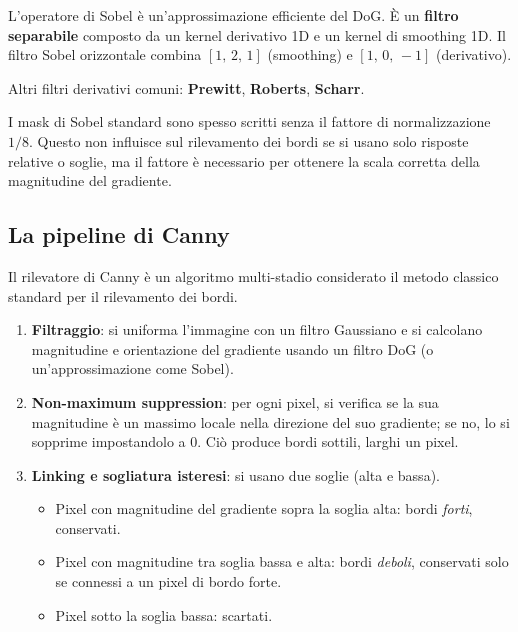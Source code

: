 \documentclass[12pt, a4paper]{report}
\begin{document}
L'operatore di Sobel è un'approssimazione efficiente del DoG.  È un
\textbf{filtro separabile} composto da un kernel derivativo 1D e un kernel di
smoothing 1D.  Il filtro Sobel orizzontale combina $[1,\,2,\,1]$ (smoothing) e
$[1,\,0,\,-1]$ (derivativo).

Altri filtri derivativi comuni: \textbf{Prewitt}, \textbf{Roberts}, \textbf{Scharr}.

\begin{notebox}
I mask di Sobel standard sono spesso scritti senza il fattore di normalizzazione
$1/8$.  Questo non influisce sul rilevamento dei bordi se si usano solo risposte
relative o soglie, ma il fattore è necessario per ottenere la scala corretta della
magnitudine del gradiente.
\end{notebox}

\subsection{La pipeline di Canny}

Il rilevatore di Canny è un algoritmo multi-stadio considerato il metodo classico
standard per il rilevamento dei bordi.

\begin{enumerate}
  \item \textbf{Filtraggio}: si uniforma l'immagine con un filtro Gaussiano e si
        calcolano magnitudine e orientazione del gradiente usando un filtro DoG (o
        un'approssimazione come Sobel).

  \item \textbf{Non-maximum suppression}: per ogni pixel, si verifica se la sua
        magnitudine è un massimo locale nella direzione del suo gradiente; se no, lo
        si sopprime impostandolo a 0.  Ciò produce bordi sottili, larghi un pixel.

  \item \textbf{Linking e sogliatura isteresi}: si usano due soglie (alta e bassa).
        \begin{itemize}
          \item Pixel con magnitudine del gradiente sopra la soglia alta:
                bordi \emph{forti}, conservati.
          \item Pixel con magnitudine tra soglia bassa e alta: bordi \emph{deboli},
                conservati solo se connessi a un pixel di bordo forte.
          \item Pixel sotto la soglia bassa: scartati.
        \end{itemize}
\end{enumerate}
\end{document}

